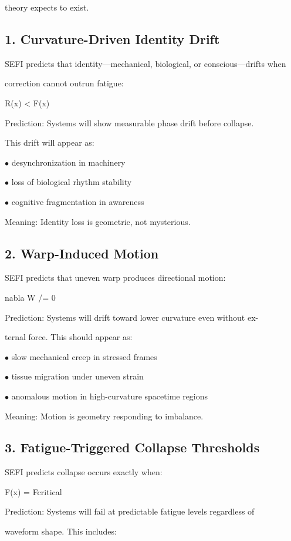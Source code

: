 \documentclass[10pt]{article}
\begin{document}
theory expects to exist.

\subsection*{1. Curvature-Driven Identity Drift}
SEFI predicts that identity---mechanical, biological, or conscious---drifts when

correction cannot outrun fatigue:

R(x) < F(x)

Prediction: Systems will show measurable phase drift before collapse.

This drift will appear as:

\noindent $\bullet$ desynchronization in machinery

\noindent $\bullet$ loss of biological rhythm stability

\noindent $\bullet$ cognitive fragmentation in awareness

Meaning: Identity loss is geometric, not mysterious.


\subsection*{2. Warp-Induced Motion}
SEFI predicts that uneven warp produces directional motion:

nabla W /= 0

Prediction: Systems will drift toward lower curvature even without ex-

ternal force. This should appear as:

\noindent $\bullet$ slow mechanical creep in stressed frames

\noindent $\bullet$ tissue migration under uneven strain

\noindent $\bullet$ anomalous motion in high-curvature spacetime regions

Meaning: Motion is geometry responding to imbalance.

\subsection*{3. Fatigue-Triggered Collapse Thresholds}
SEFI predicts collapse occurs exactly when:

F(x) = Fcritical

Prediction: Systems will fail at predictable fatigue levels regardless of

waveform shape. This includes:
\end{document}
